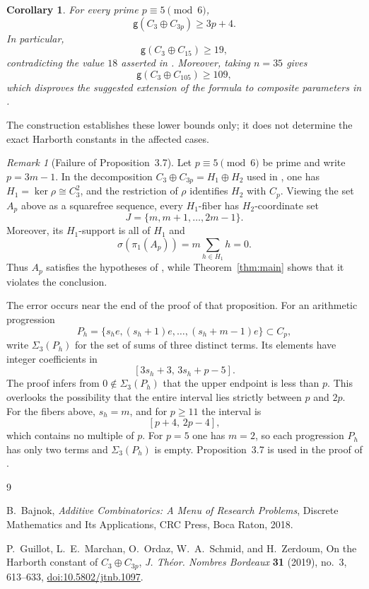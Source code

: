 \documentclass[11pt]{amsart}
\newtheorem{corollary}[theorem]{Corollary}
\theoremstyle{remark}
\newtheorem{remark}[theorem]{Remark}
\newcommand{\gH}{\mathsf{g}}
\begin{document}
\begin{corollary}\label{cor:consequences}
For every prime $p\equiv5\pmod6$,
\[
  \gH(C_3\oplus C_{3p})\ge3p+4.
\]
In particular,
\[
  \gH(C_3\oplus C_{15})\ge19,
\]
contradicting the value $18$ asserted in
\cite[Theorem~3.1]{GuillotEtAl}.
Moreover, taking $n=35$ gives
\[
  \gH(C_3\oplus C_{105})\ge109,
\]
which disproves the suggested extension of the formula to composite
parameters in \cite[p.~632]{GuillotEtAl}.
\end{corollary}

The construction establishes these lower bounds only; it does not determine
the exact Harborth constants in the affected cases.

\begin{remark}[Failure of Proposition~3.7]\label{rem:gap}
Let $p\equiv5\pmod6$ be prime and write $p=3m-1$. In the decomposition
$C_3\oplus C_{3p}=H_1\oplus H_2$ used in \cite{GuillotEtAl}, one has
$H_1=\ker\rho\cong C_3^2$, and the restriction of $\rho$ identifies
$H_2$ with $C_p$. Viewing the set $A_p$ above as a squarefree sequence,
every $H_1$-fiber has $H_2$-coordinate set
\[
  J=\{m,m+1,\ldots,2m-1\}.
\]
Moreover, its $H_1$-support is all of $H_1$ and
\[
  \sigma(\pi_1(A_p))=m\sum_{h\in H_1}h=0.
\]
Thus $A_p$ satisfies the hypotheses of
\cite[Proposition~3.7]{GuillotEtAl}, while Theorem~\ref{thm:main}
shows that it violates the conclusion.

The error occurs near the end of the proof of that proposition. For an
arithmetic progression
\[
  P_h=\{s_he,(s_h+1)e,\ldots,(s_h+m-1)e\}\subset C_p,
\]
write $\Sigma_3(P_h)$ for the set of sums of three distinct terms.
Its elements have integer coefficients in
\[
  [3s_h+3,\,3s_h+p-5].
\]
The proof infers from $0\notin\Sigma_3(P_h)$ that the upper endpoint is
less than $p$. This overlooks the possibility that the entire interval
lies strictly between $p$ and $2p$. For the fibers above, $s_h=m$, and
for $p\ge11$ the interval is
\[
  [p+4,\,2p-4],
\]
which contains no multiple of $p$. For $p=5$ one has $m=2$, so each
progression $P_h$ has only two terms and $\Sigma_3(P_h)$ is empty.
Proposition~3.7 is used in the proof of
\cite[Theorem~3.1]{GuillotEtAl}.
\end{remark}

\begin{thebibliography}{9}

B.~Bajnok,
\emph{Additive Combinatorics: A Menu of Research Problems},
Discrete Mathematics and Its Applications,
CRC Press, Boca Raton, 2018.

P.~Guillot, L.~E.~Marchan, O.~Ordaz, W.~A.~Schmid, and H.~Zerdoum,
On the Harborth constant of $C_3\oplus C_{3p}$,
\emph{J. Th\'eor. Nombres Bordeaux}
\textbf{31} (2019), no.~3, 613--633,
\href{https://doi.org/10.5802/jtnb.1097}{doi:10.5802/jtnb.1097}.

\end{thebibliography}
\end{document}

